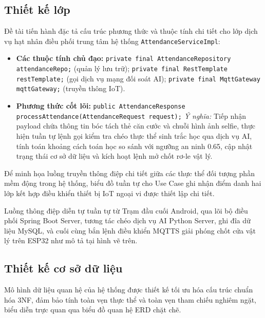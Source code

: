 ﻿\documentclass[../DoAn.tex]{subfiles}
\begin{document}
\subsection{Thiết kế lớp}

Đề tài tiến hành đặc tả cấu trúc phương thức và thuộc tính chi tiết cho lớp dịch vụ hạt nhân điều phối trung tâm hệ thống \texttt{AttendanceServiceImpl}:
\begin{itemize}
    \item \textbf{Các thuộc tính chủ đạo:} 
    \newline \texttt{private final AttendanceRepository attendanceRepo;} (quản lý lưu trữ); 
    \newline \texttt{private final RestTemplate restTemplate;} (gọi dịch vụ mạng đối soát AI); 
    \newline \texttt{private final MqttGateway mqttGateway;} (truyền thông IoT).
    \item \textbf{Phương thức cốt lõi:} 
    \newline \texttt{public AttendanceResponse processAttendance(AttendanceRequest request);}
    \newline \textit{Ý nghĩa:} Tiếp nhận payload chứa thông tin bóc tách thẻ căn cước và chuỗi hình ảnh selfie, thực hiện tuần tự lệnh gọi kiểm tra chéo thực thể sinh trắc học qua dịch vụ AI, tính toán khoảng cách toán học so sánh với ngưỡng an ninh 0.65, cập nhật trạng thái cơ sở dữ liệu và kích hoạt lệnh mở chốt rơ-le vật lý.
\end{itemize}

Để minh họa luồng truyền thông điệp chi tiết giữa các thực thể đối tượng phần mềm động trong hệ thống, biểu đồ tuần tự cho Use Case ghi nhận điểm danh hai lớp kết hợp điều khiển thiết bị IoT ngoại vi được thiết lập chi tiết.

Luồng thông điệp diễn tự tuần tự từ Trạm đầu cuối Android, qua lõi bộ điều phối Spring Boot Server, tương tác chéo dịch vụ AI Python Server, ghi đĩa dữ liệu MySQL, và cuối cùng bắn lệnh điều khiển MQTTS giải phóng chốt cửa vật lý trên ESP32 như mô tả tại hình vẽ trên.

\subsection{Thiết kế cơ sở dữ liệu}

Mô hình dữ liệu quan hệ của hệ thống được thiết kế tối ưu hóa cấu trúc chuẩn hóa 3NF, đảm bảo tính toàn vẹn thực thể và toàn vẹn tham chiếu nghiêm ngặt, biểu diễn trực quan qua biểu đồ quan hệ ERD chặt chẽ.
\end{document}
